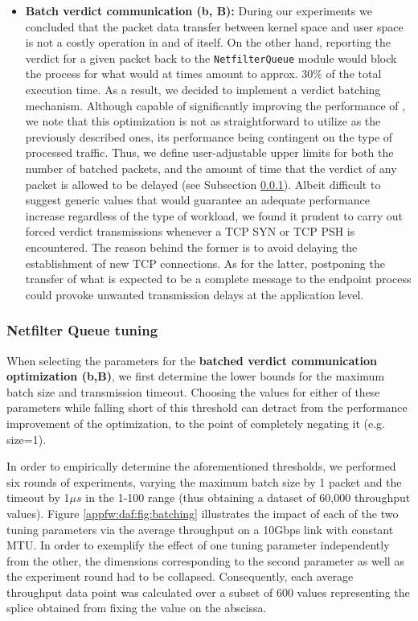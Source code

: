 \begin{itemize}
    \item \textbf{Batch verdict communication (b, B):} During our experiments we concluded that the packet data transfer between kernel space and user space is not a costly operation in and of itself. On the other hand, reporting the verdict for a given packet back to the \texttt{NetfilterQueue} module would block the process for what would at times amount to approx. 30\% of the total execution time. As a result, we decided to implement a verdict batching mechanism. Although capable of significantly improving the performance of \daf{}, we note that this optimization is not as straightforward to utilize as the previously described ones, its performance being contingent on the type of processed traffic. Thus, we define user-adjustable upper limits for both the number of batched packets, and the amount of time that the verdict of any packet is allowed to be delayed (see Subsection \ref{appfw:daf:queuq-verdict-batch-tuning}). Albeit difficult to suggest generic values that would guarantee an adequate performance increase regardless of the type of workload, we found it prudent to carry out forced verdict transmissions whenever a TCP SYN or TCP PSH is encountered. The reason behind the former is to avoid delaying the establishment of new TCP connections. As for the latter, postponing the transfer of what is expected to be a complete message to the endpoint process could provoke unwanted transmission delays at the application level.
\end{itemize}


\subsubsection{Netfilter Queue tuning}
\label{appfw:daf:queuq-verdict-batch-tuning}

When selecting the parameters for the \textbf{batched verdict communication optimization (b,B)}, we first determine the lower bounds for the maximum batch size and transmission timeout. Choosing the values for either of these parameters while falling short of this threshold can detract from the performance improvement of the optimization, to the point of completely negating it (e.g. size=1).



In order to empirically determine the aforementioned thresholds, we performed six rounds of experiments, varying the maximum batch size by 1 packet and the timeout by 1$\mu{}s$ in the 1-100 range (thus obtaining a dataset of 60,000 throughput values). Figure \ref{appfw:daf:fig:batching} illustrates the impact of each of the two tuning parameters via the average throughput on a 10Gbps link with constant MTU. In order to exemplify the effect of one tuning parameter independently from the other, the dimensions corresponding to the second parameter as well as the experiment round had to be collapsed. Consequently, each average throughput data point was calculated over a subset of 600 values representing the splice obtained from fixing the value on the abscissa.

